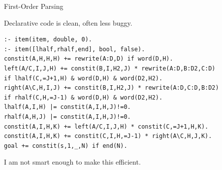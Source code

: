 \documentclass{beamer}
\def\im#1#2{
  \node(#1) [scale=#2]{\pgfbox[center,top]{\pgfuseimage{#1}}
};}
\newcommand{\air}{\vspace{0.5cm}}
\begin{document}
\begin{frame}[c]{First-Order Parsing}
  \vspace{-3cm}
  \begin{figure}
    \centering
  \end{figure}
\end{frame}



\begin{frame}[fragile]
  Declarative code is clean, often less buggy.
  \air 

  \begin{small}
  \begin{verbatim}
:- item(item, double, 0).
:- item([lhalf,rhalf,end], bool, false).
constit(A,H,H,H) += rewrite(A:D,D) if word(D,H).
left(A/C,I,J,H) += constit(B,I,H2,J) * rewrite(A:D,B:D2,C:D) 
if lhalf(C,=J+1,H) & word(D,H) & word(D2,H2).
right(A\C,H,I,J) += constit(B,I,H2,J) * rewrite(A:D,C:D,B:D2) 
if rhalf(C,H,=J-1) & word(D,H) & word(D2,H2).
lhalf(A,I,H) |= constit(A,I,H,J)!=0.
rhalf(A,H,J) |= constit(A,I,H,J)!=0.
constit(A,I,H,K) += left(A/C,I,J,H) * constit(C,=J+1,H,K). 
constit(A,I,H,K) += constit(C,I,H,=J-1) * right(A\C,H,J,K).
goal += constit(s,1,_,N) if end(N).
  \end{verbatim}
  \end{small}

  \pause

  I am not smart enough to make this efficient. 

\end{frame}


\end{document}
